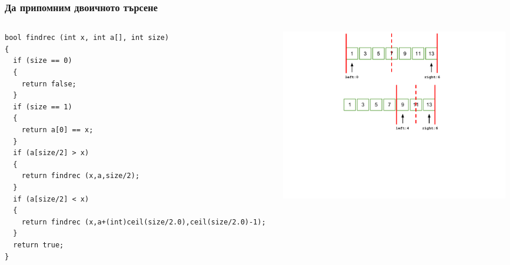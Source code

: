 \documentclass{beamer}
\begin{document}
\begin{frame}[fragile]
\frametitle{Да припомним двоичното търсене}



\begin{columns}[t]
  \begin{column}{0.5\textwidth}

\begin{lstlisting}
bool findrec (int x, int a[], int size)
{
  if (size == 0)
  {
    return false;
  }
  if (size == 1)
  {
    return a[0] == x;
  }
  if (a[size/2] > x)
  {
    return findrec (x,a,size/2);
  }
  if (a[size/2] < x)
  {
    return findrec (x,a+(int)ceil(size/2.0),ceil(size/2.0)-1);
  }
  return true;
}
\end{lstlisting}


  \end{column}
  \begin{column}{0.5\textwidth}
\vspace*{-1pt}
\hspace*{-50pt}
\includegraphics[width=10cm]{images/binsearch_smaller} 

  \end{column}
\end{columns}



\end{frame}
\end{document}
